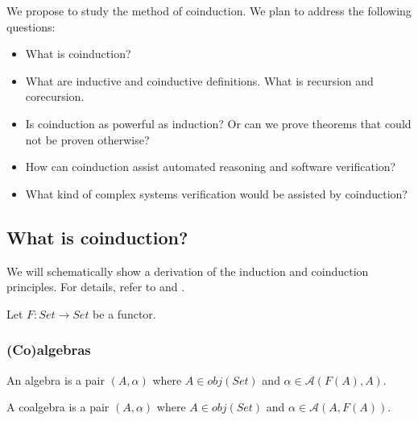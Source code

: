 We propose to study the method of coinduction. We plan to address the following questions:

\begin{itemize}
\item What is coinduction?
\item What are inductive and coinductive definitions. What is recursion and corecursion.
\item Is coinduction as powerful as induction? Or can we prove theorems that could not be proven otherwise?
\item How can coinduction assist automated reasoning and software verification?
\item What kind of complex systems verification would be assisted by coinduction?
\end{itemize}

\subsection{What is coinduction?}

We will schematically show a derivation of the induction and coinduction principles. For details, refer to \cite{rutten} and \cite{leinster}.

Let $F: Set \to Set$ be a functor.

\subsubsection{(Co)algebras}

\begin{definition}[Algebra]
An algebra is a pair $(A,\alpha)$ where $A \in obj(Set)$ and $\alpha \in \mathcal{A}(F(A),A)$.

\begin{center}
\end{center}
\end{definition}

\begin{definition}[Coalgebra]
A coalgebra is a pair $(A,\alpha)$ where $A \in obj(Set)$ and $\alpha \in \mathcal{A}(A,F(A))$.

\begin{center}
\end{center}
\end{definition}

